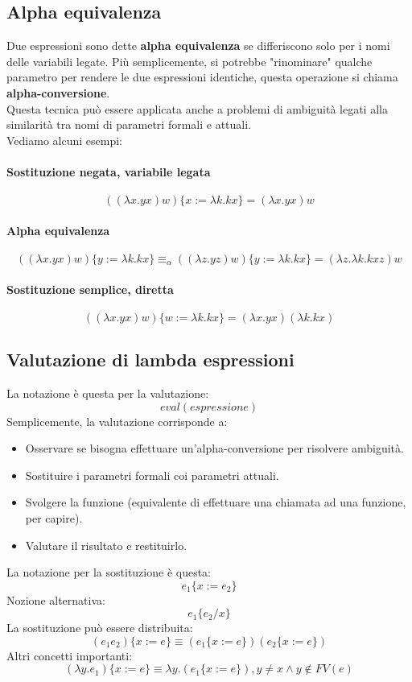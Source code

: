 \documentclass[12pt,a4paper]{article}
\begin{document}
\subsection{Alpha equivalenza}
Due espressioni sono dette \textbf{alpha equivalenza} se differiscono solo per i nomi delle variabili legate. Più semplicemente, si potrebbe "rinominare" qualche parametro per rendere le due espressioni identiche, questa operazione si chiama \textbf{alpha-conversione}.\\
Questa tecnica può essere applicata anche a problemi di ambiguità legati alla similarità tra nomi di parametri formali e attuali.\\
Vediamo alcuni esempi:
\paragraph{Sostituzione negata, variabile legata}
\[
((\lambda x.yx)w)\{x := \lambda k.kx\} = (\lambda x.yx)w
\]
\paragraph{Alpha equivalenza}
\[
((\lambda x.yx)w)\{y := \lambda k.kx\} \equiv_\alpha ((\lambda z.yz)w)\{y := \lambda k.kx\} = (\lambda z.\lambda k.kx z)w
\]
\paragraph{Sostituzione semplice, diretta}
\[
((\lambda x.yx)w)\{w := \lambda k.kx\} = (\lambda x.yx)(\lambda k.kx)
\]

\subsection{Valutazione di lambda espressioni}
La notazione è questa per la valutazione:
\[
eval(espressione)
\]
Semplicemente, la valutazione corrisponde a:
\begin{itemize}
  \item Osservare se bisogna effettuare un'alpha-conversione per risolvere ambiguità.
  \item Sostituire i parametri formali coi parametri attuali.
  \item Svolgere la funzione (equivalente di effettuare una chiamata ad una funzione, per capire).
  \item Valutare il risultato e restituirlo.
\end{itemize}
La notazione per la sostituzione è questa:
\[
e_1\{x := e_2\}
\]
Nozione alternativa:
\[
e_1\{e_2 / x\}
\]
La sostituzione può essere distribuita:
\[
(e_1 e_2)\{x := e\} \equiv (e_1 \{x := e\})(e_2 \{x := e\})
\] 
Altri concetti importanti:
\[
(\lambda y.e_1)\{x := e\} \equiv \lambda y.(e_1 \{x := e\}), y \ne x \land y \notin FV(e)
\]
\end{document}
